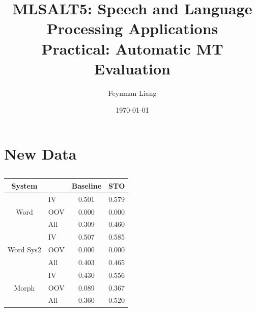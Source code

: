 \documentclass[a4paper,oneside,reqno]{amsart}
\newcommand{\authorname}{Feynman Liang}
\newcommand{\coursename}{MLSALT5: Speech and Language Processing Applications}
\newcommand{\assignmentname}{Practical: Automatic MT Evaluation}
\begin{document}
%

\title{\coursename\\\assignmentname}

\author{\authorname}
\date{\today}

\maketitle

\section{New Data}

\begin{table}[ht!]
  \begin{tabular}{clcc}
    \toprule
    System                     &     & Baseline & STO \\
    \midrule
    \multirow{3}{*}{Word}      & IV  & 0.501 & 0.579\\
                               & OOV & 0.000 & 0.000\\
                               & All & 0.309 & 0.460\\
                               \hline
    \multirow{3}{*}{Word Sys2} & IV  & 0.507 & 0.585\\
                               & OOV & 0.000 & 0.000\\
                               & All & 0.403 & 0.465\\
                               \hline
    \multirow{3}{*}{Morph}     & IV  & 0.430 & 0.556\\
                               & OOV & 0.089 & 0.367\\
                               & All & 0.360 & 0.520\\
    \bottomrule
  \end{tabular}
  \caption{}
  \label{tab:}
\end{table}
\end{document}
